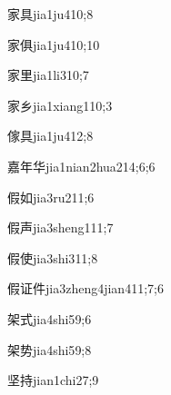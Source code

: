 \begin{verbete}{家具}{jia1ju4}{10;8}
\end{verbete}

\begin{verbete}{家俱}{jia1ju4}{10;10}
\end{verbete}

\begin{verbete}{家里}{jia1li3}{10;7}
\end{verbete}

\begin{verbete}{家乡}{jia1xiang1}{10;3}
\end{verbete}

\begin{verbete}{傢具}{jia1ju4}{12;8}
\end{verbete}

\begin{verbete}{嘉年华}{jia1nian2hua2}{14;6;6}
\end{verbete}

\begin{verbete}{假如}{jia3ru2}{11;6}
\end{verbete}

\begin{verbete}{假声}{jia3sheng1}{11;7}
\end{verbete}

\begin{verbete}{假使}{jia3shi3}{11;8}
\end{verbete}

\begin{verbete}{假证件}{jia3zheng4jian4}{11;7;6}
\end{verbete}

\begin{verbete}{架式}{jia4shi5}{9;6}
\end{verbete}

\begin{verbete}{架势}{jia4shi5}{9;8}
\end{verbete}

\begin{verbete}{坚持}{jian1chi2}{7;9}
\end{verbete}

